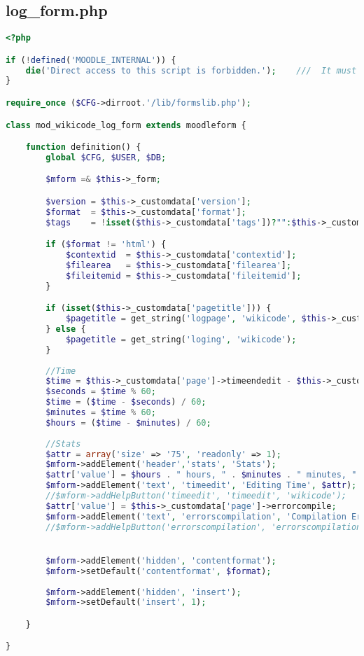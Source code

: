 \subsection{log\_form.php}
\begin{lstlisting}[language=PHP]
<?php

if (!defined('MOODLE_INTERNAL')) {
    die('Direct access to this script is forbidden.');    ///  It must be included from a Moodle page
}

require_once ($CFG->dirroot.'/lib/formslib.php');

class mod_wikicode_log_form extends moodleform {

    function definition() {
        global $CFG, $USER, $DB;

        $mform =& $this->_form;

        $version = $this->_customdata['version'];
        $format  = $this->_customdata['format'];
        $tags    = !isset($this->_customdata['tags'])?"":$this->_customdata['tags'];

        if ($format != 'html') {
            $contextid  = $this->_customdata['contextid'];
            $filearea   = $this->_customdata['filearea'];
            $fileitemid = $this->_customdata['fileitemid'];
        }

        if (isset($this->_customdata['pagetitle'])) {
            $pagetitle = get_string('logpage', 'wikicode', $this->_customdata['pagetitle']);
        } else {
            $pagetitle = get_string('loging', 'wikicode');
        }
		
		//Time
		$time = $this->_customdata['page']->timeendedit - $this->_customdata['page']->timestartedit;
		$seconds = $time % 60;
		$time = ($time - $seconds) / 60;
		$minutes = $time % 60;
		$hours = ($time - $minutes) / 60;		
		
		//Stats
		$attr = array('size' => '75', 'readonly' => 1);
		$mform->addElement('header','stats', 'Stats');
		$attr['value'] = $hours . " hours, " . $minutes . " minutes, " . $seconds . " seconds";
		$mform->addElement('text', 'timeedit', 'Editing Time', $attr);
		//$mform->addHelpButton('timeedit', 'timeedit', 'wikicode');
		$attr['value'] = $this->_customdata['page']->errorcompile;
		$mform->addElement('text', 'errorscompilation', 'Compilation Errors', $attr);
		//$mform->addHelpButton('errorscompilation', 'errorscompilation', 'wikicode');


        $mform->addElement('hidden', 'contentformat');
        $mform->setDefault('contentformat', $format);
		
		$mform->addElement('hidden', 'insert');
		$mform->setDefault('insert', 1);

    }

}
\end{lstlisting}

